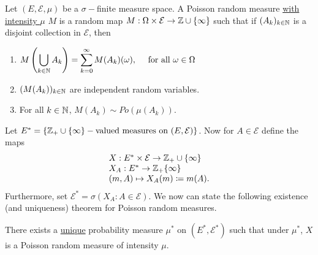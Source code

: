 \documentclass{article}
\begin{document}
\begin{boxdef}\label{def: poisson random measure}
	Let $ (E, \mathcal{E}, \mu)$ be a $ \sigma-$finite measure space. A Poisson random measure \underline{with intensity $\mu$} $M$ is a random map $ M: \Omega \times \mathcal{E}\to \mathbb{Z}\cup\{\infty\}$ such that if $ (A_{k})_{k\in \mathbb{N}}$ is a disjoint collection in $ \mathcal{E}$, then 
	\begin{enumerate}
		\item $M \left( \displaystyle\bigcup_{k\in \mathbb{N}} A_{k} \right) =\displaystyle\sum^{\infty}_{k=0}M(A_{k})(\omega), \quad \text{ for all } \omega\in \Omega $
		\item $(M(A_{k}))_{k\in \mathbb{N}}$ are independent random variables.
		\item For all $ k\in \mathbb{N}$, $ M(A_{k})
			\sim Po(\mu(A_{k}))$.
	\end{enumerate}
\end{boxdef}

Let $ E^{*} = \{\mathbb{Z}_{+}\cup \{\infty\}-\text{valued measures on }(E, \mathcal{E})\}$. Now for $ A\in \mathcal{E}$ define the maps
\[
\begin{array}{ll}
	X: E^{*}\times \mathcal{E}\to \mathbb{Z}_{+}\cup\{\infty\} \\
	X_{A}:E^{*}\to \mathbb{Z}_{+}\{\infty\}\\ 
	(m,A)\mapsto X_{A}(m)\coloneqq m(A).
\end{array}
\]
Furthermore, set $ \mathcal{E}^{*} = \sigma(X_{A}:A\in \mathcal{E})$. We now can state the following existence (and uniqueness) theorem for Poisson random measures. 

\begin{theorem}\label{thm: prm existence and uniqueness}
	There exists a \underline{unique} probability measure $ \mu^{*}$ on $ (E^{*}, \mathcal{E}^{*})$ such that under $ \mu^{*}$, $ X$ is a Poisson random measure of intensity $ \mu$.
\end{theorem}
\end{document}
